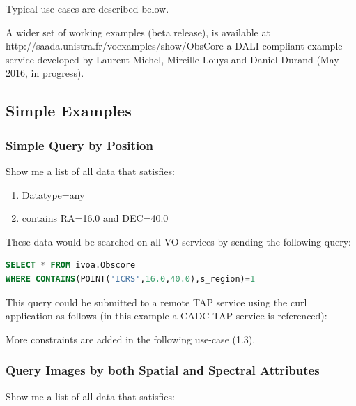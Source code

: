 \documentclass[11pt,a4paper]{ivoa}
\begin{document}
Typical use-cases are described below.

A wider set of working examples (beta release), is available at http://saada.unistra.fr/voexamples/show/ObsCore a DALI
compliant example service developed by Laurent Michel, Mireille Louys and Daniel Durand (May 2016, in progress).

\subsection*{Simple Examples}

\subsubsection*{Simple Query by Position}

Show me a list of all data that satisfies:
\begin{enumerate}
\item Datatype=any
\item contains RA=16.0 and DEC=40.0
\end{enumerate}
These data would be searched on all VO services by sending the following query:

\begin{lstlisting}[language=SQL , flexiblecolumns=true]
SELECT * FROM ivoa.Obscore
WHERE CONTAINS(POINT('ICRS',16.0,40.0),s_region)=1
\end{lstlisting}

This query could be submitted to a remote TAP service using the curl application as follows (in this example a CADC TAP
service is referenced):


More constraints are added in the following use-case (1.3).

\subsubsection*{Query Images by both Spatial and Spectral Attributes}

Show me a list of all data that satisfies:
\end{document}
